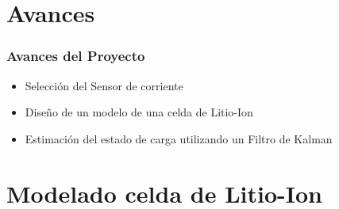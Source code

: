 \documentclass[10pt]{beamer}
\theoremstyle{remark}
\theoremstyle{definition}
\begin{document}
\section{Avances}
\begin{frame}[allowframebreaks]
\frametitle{Avances del Proyecto}
	\begin{itemize}
	  \item Selección del Sensor de corriente
	  \item Diseño de un modelo de una celda de Litio-Ion
	  \item Estimación del estado de carga utilizando un Filtro de Kalman
	\end{itemize}
\end{frame}

\section{Modelado celda de Litio-Ion}
\end{document}
